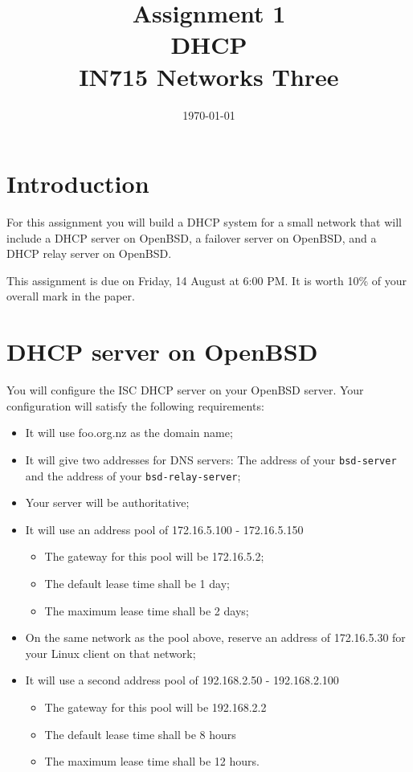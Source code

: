 \documentclass{article}
\begin{document}
\title{ Assignment 1 \\ DHCP \\ IN715 Networks Three}
\date{\today}
\maketitle

\section*{Introduction}
For this assignment you will build a DHCP system for a small network that will include a DHCP server on OpenBSD, a failover server on OpenBSD, and a DHCP relay server on OpenBSD.

This assignment is due on Friday, 14 August at 6:00 PM.  It is worth 10\% of your overall mark in the paper.

\section{DHCP server on OpenBSD}
You will configure the ISC DHCP server on your OpenBSD server.  Your configuration will satisfy the following requirements:

\begin{itemize}
  \item It will use foo.org.nz as the domain name;
  \item It will give two addresses for DNS servers: The address of your \texttt{bsd-server} and the address of your \texttt{bsd-relay-server};
  \item Your server will be authoritative;
  \item It will use an address pool of 172.16.5.100 - 172.16.5.150
    \begin{itemize}
      \item The gateway for this pool will be 172.16.5.2;
      \item The default lease time shall be 1 day;
      \item The maximum lease time shall be 2 days;
    \end{itemize}
  \item On the same network as the pool above, reserve an address of
        172.16.5.30 for your Linux client on that network;
  \item It will use a second  address pool of 192.168.2.50 - 192.168.2.100
    \begin{itemize}
      \item The gateway for this pool will be 192.168.2.2
      \item The default lease time shall be 8 hours
      \item The maximum lease time shall be 12 hours.
    \end{itemize}
\end{itemize}
\end{document}
